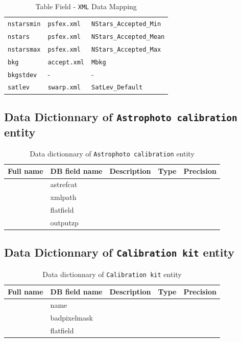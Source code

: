 \documentclass[twoside,a4paper]{article}
\begin{document}
\begin{table}[!h]
{\begin{tabular}{|l|l|l|}
{\tt nstarsmin} & {\tt psfex.xml} & {\tt NStars\_Accepted\_Min}\\
{\tt nstars} & {\tt psfex.xml} & {\tt NStars\_Accepted\_Mean}\\
{\tt nstarsmax} & {\tt psfex.xml} & {\tt NStars\_Accepted\_Max}\\
{\tt bkg} & {\tt accept.xml} & {\tt Mbkg}\\
{\tt bkgstdev} & - & -\\
{\tt satlev} & {\tt swarp.xml} & {\tt SatLev\_Default}\\
\hline
\end{tabular}}
\caption{Table Field - {\tt XML} Data Mapping}
\end{table}

\subsection{Data Dictionnary of {\tt Astrophoto calibration} entity}
\begin{table}[!h]
\centering
\footnotesize{
\begin{tabular}{|l|l|l|l|l|}
\hline
Full name & DB field name & Description & Type & Precision\\
\hline
& astrefcat & & &\\
& xmlpath & & &\\
& flatfield & & &\\
& outputzp & & &\\
\hline
\end{tabular}}
\caption{Data dictionnary of {\tt Astrophoto calibration} entity}
\end{table}

\subsection{Data Dictionnary of {\tt Calibration kit} entity}
\begin{table}[!h]
\centering
\footnotesize{
\begin{tabular}{|l|l|l|l|l|}
\hline
Full name & DB field name & Description & Type & Precision\\
\hline
& name&&&\\
& badpixelmask&&&\\
& flatfield&&&\\
\hline
\end{tabular}}
\caption{Data dictionnary of {\tt Calibration kit} entity}
\end{table}
\end{document}

